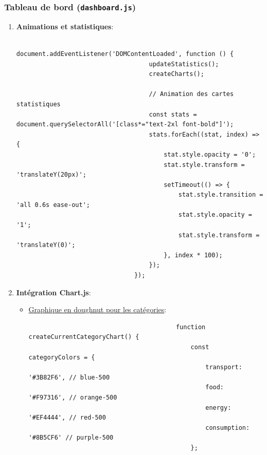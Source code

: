 \documentclass[a4paper,11pt]{article}
\begin{document}
                \subsubsection{Tableau de bord (\texttt{dashboard.js})}
                \begin{enumerate}
                    \item \textbf{Animations et statistiques}:
                        \begin{tcolorbox}[colback=lightgray!6, colframe=black, left=-65mm, right=5mm, top=2mm, bottom=0mm, boxrule=0.1mm]
                            \begin{verbatim}
                                document.addEventListener('DOMContentLoaded', function () {
                                    updateStatistics();
                                    createCharts();

                                    // Animation des cartes statistiques
                                    const stats = document.querySelectorAll('[class*="text-2xl font-bold"]');
                                    stats.forEach((stat, index) => {
                                        stat.style.opacity = '0';
                                        stat.style.transform = 'translateY(20px)';
                                        setTimeout(() => {
                                            stat.style.transition = 'all 0.6s ease-out';
                                            stat.style.opacity = '1';
                                            stat.style.transform = 'translateY(0)';
                                        }, index * 100);
                                    });
                                });
                            \end{verbatim}
                        \end{tcolorbox}

                    \item \textbf{Intégration Chart.js}:
                        \begin{itemize}
                            \item \underline{Graphique en doughnut pour les catégories}:
                                \begin{tcolorbox}[colback=lightgray!6, colframe=black, left=-75mm, right=5mm, top=2mm, bottom=0mm, boxrule=0.1mm]
                                    \begin{verbatim}
                                        function createCurrentCategoryChart() {
                                            const categoryColors = {
                                                transport: '#3B82F6', // blue-500
                                                food: '#F97316', // orange-500
                                                energy: '#EF4444', // red-500
                                                consumption: '#8B5CF6' // purple-500
                                            };


\end{verbatim}
\end{tcolorbox}
\end{itemize}
\end{enumerate}
\end{document}
